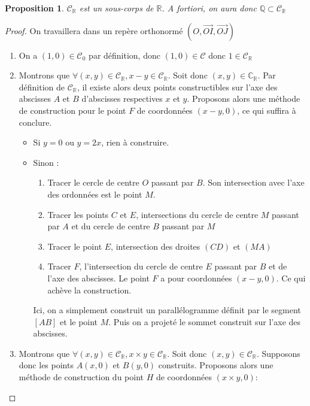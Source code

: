 \documentclass[a4paper,12pt,french]{report}
\newtheorem{proposition}{Proposition}[section]
\begin{document}
			
		\begin{proposition} \( \mathscr{C}_\mathbb{R} \) est un sous-corps de \(\mathbb{R}\). A fortiori, on aura donc \( \mathbb{Q} \subset \mathscr{C}_\mathbb{R} \)
		\end{proposition}
			\begin{proof}
				On travaillera dans un repère orthonormé $(O, \vec{OI}, \vec{OJ})$
				\begin{enumerate}
					\item On a $(1, 0) \in \mathscr{C}_0$ par définition, donc $(1, 0) \in \mathscr{C}$ donc $1 \in \mathscr{C}_\mathbb{R}$
					\item Montrons que $\forall (x, y) \in \mathscr{C}_\mathbb{R}, x-y \in \mathscr{C}_\mathbb{R}$. Soit donc $(x, y) \in \mathbb{C}_\mathbb{R}$. Par définition de $\mathscr{C}_\mathbb{R}$, il existe alors deux points constructibles sur l'axe des abscisses $A$ et $B$ d'abscisses respectives $x$ et $y$. Proposons alors une méthode de construction pour le point $F$ de coordonnées $(x-y, 0)$, ce qui suffira à conclure.
						\begin{itemize}
							\item Si $y = 0$ ou $y = 2x$, rien à construire.
							\item Sinon : 
								\begin{enumerate}
									\item Tracer le cercle de centre $O$ passant par $B$. Son intersection avec l'axe des ordonnées est le point $M$.
									\item Tracer les points $C$ et $E$, intersections du cercle de centre $M$ passant par $A$ et du cercle de centre $B$ passant par $M$
									\item Tracer le point $E$, intersection des droites $(CD)$ et $(MA)$
									\item Tracer $F$, l'intersection du cercle de centre $E$ passant par $B$ et de l'axe des abscisses. Le point $F$ a pour coordonnées $(x-y, 0)$. Ce qui achève la construction.	
								\end{enumerate}
								Ici, on a simplement construit un parallélogramme définit par le segment $[AB]$ et le point $M$. Puis on a projeté le sommet construit sur l'axe des abscisses.
						\end{itemize}
					\item Montrons que \( \forall (x, y) \in \mathscr{C}_\mathbb{R}, x \times y \in \mathscr{C}_\mathbb{R}\). Soit donc $(x, y) \in \mathscr{C}_\mathbb{R}$. Supposons donc les points $A (x, 0)$ et $B (y, 0)$ construits. Proposons alors une méthode de construction du point $H$ de coordonnées $(x\times y, 0)$:

\end{enumerate}
\end{proof}
\end{document}
